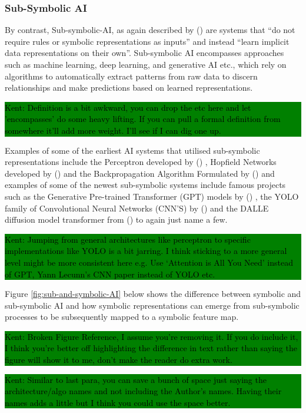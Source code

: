 \documentclass[hf]{ceurart}
\newcommand{\citeauthornum}[1]{\citeauthor{#1} (\citeyear{#1}) \cite{#1}}
\newcommand{\pinaforecomment}[4]{\colorbox{#1}{\textcolor{#4}{\parbox{.8\linewidth}{#2: #3}}}}
\newcommand{\osullikomment}[1]{\pinaforecomment{green}{Kent}{#1}{black}}
\begin{document}
\subsubsection{\textbf{Sub-Symbolic AI}}
By contrast, Sub-symbolic-AI, as again described by \citeauthornum{Dingli2023} are systems that \enquote{do not require rules or symbolic representations as inputs} and instead \enquote{learn implicit data representations on their own}. Sub-symbolic AI encompasses approaches such as machine learning, deep learning, and generative AI etc., which rely on algorithms to automatically extract patterns from raw data to discern relationships and make predictions based on learned representations. 
%
\osullikomment{Definition is a bit awkward, you can drop the etc here and let 'encompasses' do some heavy lifting. If you can pull a formal definition from somewhere it'll add more weight. I'll see if I can dig one up.}
%
Examples of some of the earliest AI systems that utilised sub-symbolic representations include the Perceptron developed by \citeauthornum{Rosenblatt1958}, Hopfield Networks developed by \citeauthornum{Hopfield1982} and the Backpropagation Algorithm Formulated by \citeauthornum{Rumelhart1986} and examples of some of the newest sub-symbolic systems include famous projects such as the Generative Pre-trained Transformer (GPT) models by \citeauthornum{Vaswani2017}, the YOLO family of Convolutional Neural Networks (CNN'S) by \citeauthornum{Redmon2015} and the DALLE diffusion model transformer from \citeauthornum{Ramesh2021} to again just name a few. 
%
\osullikomment{Jumping from general architectures like perceptron to specific implementations like YOLO is a bit jarring. I think sticking to a more general level might be more consistent here e.g. Use `Attention is All You Need' instead of GPT, Yann Lecunn's CNN paper instead of YOLO etc.}
%
Figure \ref{fig:sub-and-symbolic-AI} below shows the difference between symbolic and sub-symbolic AI and how symbolic representations can emerge from sub-symbolic processes to be subsequently mapped to a symbolic feature map.
\osullikomment{Broken Figure Reference, I assume you're removing it. If you do include it, I think you're better off highlighting the difference in text rather than saying the figure will show it to me, don't make the reader do extra work.}

\osullikomment{Similar to last para, you can save a bunch of space just saying the architecture/algo names and not including the Author's names. Having their names adds a little but I think you could use the space better. }
\end{document}
